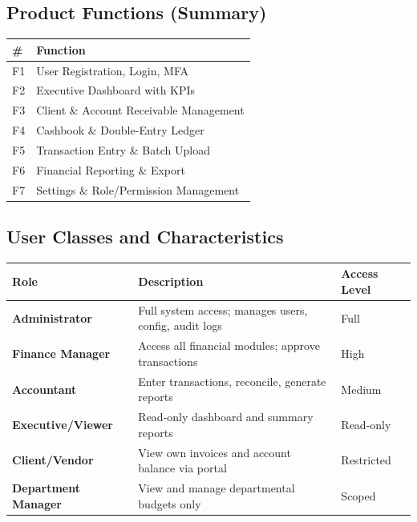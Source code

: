 \documentclass[journal, a4paper, onecolumn, 12pt]{IEEEtran}
\begin{document}
\subsection{Product Functions (Summary)}
\begin{longtable}{|p{}|p{}|}
\hline
\# & Function \\ \hline
\hline
F1 & User Registration, Login, MFA \\ \hline
F2 & Executive Dashboard with KPIs \\ \hline
F3 & Client \& Account Receivable Management \\ \hline
F4 & Cashbook \& Double-Entry Ledger \\ \hline
F5 & Transaction Entry \& Batch Upload \\ \hline
F6 & Financial Reporting \& Export \\ \hline
F7 & Settings \& Role/Permission Management \\ \hline
\end{longtable}
\subsection{User Classes and Characteristics}

\begin{longtable}{|p{}|p{}|p{}|}
\hline
Role & Description & Access Level \\ \hline
\hline
\textbf{Administrator} & Full system access; manages users, config, audit logs & Full \\ \hline
\textbf{Finance Manager} & Access all financial modules; approve transactions & High \\ \hline
\textbf{Accountant} & Enter transactions, reconcile, generate reports & Medium \\ \hline
\textbf{Executive/Viewer} & Read-only dashboard and summary reports & Read-only \\ \hline
\textbf{Client/Vendor} & View own invoices and account balance via portal & Restricted \\ \hline
\textbf{Department Manager} & View and manage departmental budgets only & Scoped \\ \hline
\end{longtable}
\end{document}

